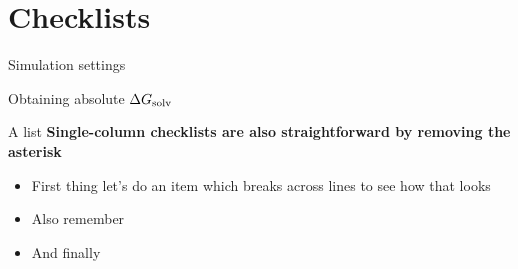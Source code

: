 \documentclass[9pt,tutorial]{livecoms}
\begin{document}
%

\section{Checklists}

\begin{Checklists}
	
\begin{checklist}{Simulation settings}
\end{checklist}

\begin{checklist}{Obtaining absolute $\Delta G_\textup{solv}$ }
\end{checklist}

\begin{checklist}{A list}
\textbf{Single-column checklists are also straightforward by removing the asterisk}
\begin{itemize}
\item First thing let's do an item which breaks across lines to see how that looks
\item Also remember
\item And finally
\end{itemize}
\end{checklist}
%

\end{Checklists}
\end{document}
